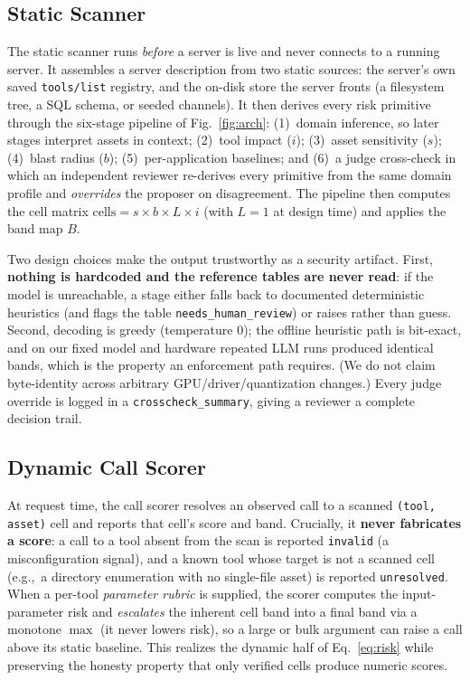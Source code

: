 \documentclass[conference]{IEEEtran}
\newcommand{\eg}{e.g.,\ }
\begin{document}
\subsection{Static Scanner}

The static scanner runs \emph{before} a server is live and never connects to a
running server. It assembles a server description from two static sources: the
server's own saved \texttt{tools/list} registry, and the on-disk store the server
fronts (a filesystem tree, a SQL schema, or seeded channels). It then derives
every risk primitive through the six-stage pipeline of Fig.~\ref{fig:arch}:
(1)~domain inference, so later stages interpret assets in context;
(2)~tool impact ($i$); (3)~asset sensitivity ($s$); (4)~blast radius ($b$);
(5)~per-application baselines; and (6)~a judge cross-check in which an independent
reviewer re-derives every primitive from the same domain profile and
\emph{overrides} the proposer on disagreement. The pipeline then computes the cell
matrix $\text{cells}=s\times b\times L\times i$ (with $L{=}1$ at design time) and
applies the band map $B$.

Two design choices make the output trustworthy as a security artifact. First,
\textbf{nothing is hardcoded and the reference tables are never read}: if the
model is unreachable, a stage either falls back to documented deterministic
heuristics (and flags the table \texttt{needs\_human\_review}) or raises rather
than guess. Second, decoding is greedy (temperature $0$); the offline heuristic
path is bit-exact, and on our fixed model and hardware repeated LLM runs produced
identical bands, which is the property an enforcement path requires. (We do not
claim byte-identity across arbitrary GPU/driver/quantization changes.) Every judge
override is logged in a \texttt{crosscheck\_summary}, giving a reviewer a complete
decision trail.

\subsection{Dynamic Call Scorer}

At request time, the call scorer resolves an observed call to a scanned
\texttt{(tool, asset)} cell and reports that cell's score and band. Crucially, it
\textbf{never fabricates a score}: a call to a tool absent from the scan is
reported \texttt{invalid} (a misconfiguration signal), and a known tool whose
target is not a scanned cell (\eg a directory enumeration with no single-file
asset) is reported \texttt{unresolved}. When a per-tool \emph{parameter rubric} is
supplied, the scorer computes the input-parameter risk and \emph{escalates} the
inherent cell band into a final band via a monotone $\max$ (it never lowers risk),
so a large or bulk argument can raise a call above its static baseline. This
realizes the dynamic half of Eq.~\ref{eq:risk} while preserving the honesty
property that only verified cells produce numeric scores.
\end{document}
